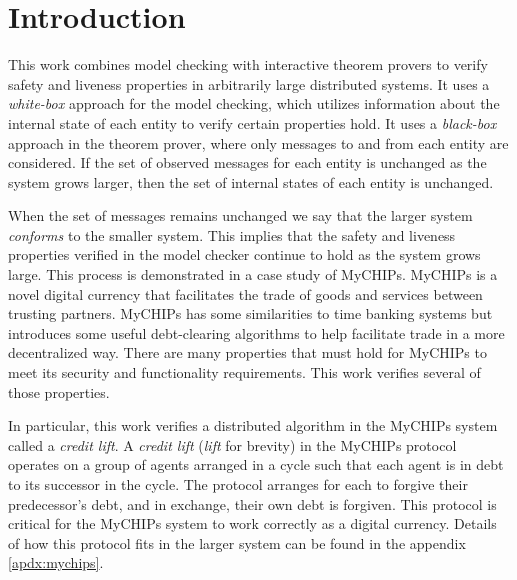 \documentclass[runningheads]{llncs}
\begin{document}




\section{Introduction}
\label{chap:introduction}
This work combines model checking with interactive theorem provers to verify safety and liveness properties in arbitrarily large distributed systems.
It uses a \emph{white-box} approach for the model checking, which utilizes information about the internal state of each entity to verify certain properties hold.
It uses a \emph{black-box} approach in the theorem prover, where only messages to and from each entity are considered.
If the set of observed messages for each entity is unchanged as the system grows larger, then the set of internal states of each entity is unchanged.

When the set of messages remains unchanged we say that the larger system \emph{conforms} to the smaller system\cite{dill_trace_theory}. This implies that the safety and liveness properties verified in the model checker continue to hold as the system grows large.
This process is demonstrated in a case study of MyCHIPs. MyCHIPs is a novel digital currency that facilitates the trade of goods and services between trusting partners.  MyCHIPs has some similarities to time banking systems \cite{timebank1} \cite{timebank2} but introduces some useful debt-clearing algorithms to help facilitate trade in a more decentralized way. There are many properties that must hold for MyCHIPs to meet its security and functionality requirements. This work verifies several of those properties.

In particular, this work verifies a distributed algorithm in the MyCHIPs system called a \emph{credit lift}. A \emph{credit lift} (\emph{lift} for brevity) in the MyCHIPs protocol operates on a group of agents arranged in a cycle such that each agent is in debt to its successor in the cycle. The protocol arranges for each to forgive their predecessor's debt, and in exchange, their own debt is forgiven. This protocol is critical for the MyCHIPs system to work correctly as a digital currency. Details of how this protocol fits in the larger system can be found in the appendix \ref{apdx:mychips}.
\end{document}
